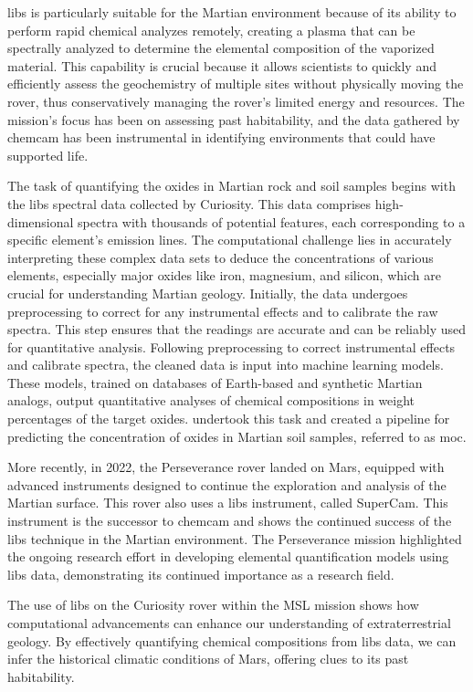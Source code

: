 \gls{libs} is particularly suitable for the Martian environment because of its ability to perform rapid chemical analyzes remotely, creating a plasma that can be spectrally analyzed to determine the elemental composition of the vaporized material. This capability is crucial because it allows scientists to quickly and efficiently assess the geochemistry of multiple sites without physically moving the rover, thus conservatively managing the rover's limited energy and resources. The mission's focus has been on assessing past habitability, and the data gathered by \gls{chemcam} has been instrumental in identifying environments that could have supported life\cite{chemcamNasaWebsite,curiosityNasaWebsite}.

The task of quantifying the oxides in Martian rock and soil samples begins with the \gls{libs} spectral data collected by Curiosity. This data comprises high-dimensional spectra with thousands of potential features, each corresponding to a specific element's emission lines. The computational challenge lies in accurately interpreting these complex data sets to deduce the concentrations of various elements, especially major oxides like iron, magnesium, and silicon, which are crucial for understanding Martian geology.
Initially, the data undergoes preprocessing to correct for any instrumental effects and to calibrate the raw spectra. This step ensures that the readings are accurate and can be reliably used for quantitative analysis. 
Following preprocessing to correct instrumental effects and calibrate spectra, the cleaned data is input into machine learning models. These models, trained on databases of Earth-based and synthetic Martian analogs, output quantitative analyses of chemical compositions in weight percentages of the target oxides\cite{wiensPreflightCalibrationInitial2013, cleggRecalibrationMarsScience2017}.
\citet{cleggRecalibrationMarsScience2017} undertook this task and created a pipeline for predicting the concentration of oxides in Martian soil samples, referred to as \gls{moc}.

More recently, in 2022, the Perseverance rover landed on Mars, equipped with advanced instruments designed to continue the exploration and analysis of the Martian surface. This rover also uses a \gls{libs} instrument, called SuperCam. This instrument is the successor to \gls{chemcam} and shows the continued success of the \gls{libs} technique in the Martian environment. The Perseverance mission highlighted the ongoing research effort in developing elemental quantification models using \gls{libs} data\cite{andersonPostlandingMajorElement2022}, demonstrating its continued importance as a research field.

The use of \gls{libs} on the Curiosity rover within the MSL mission shows how computational advancements can enhance our understanding of extraterrestrial geology. By effectively quantifying chemical compositions from \gls{libs} data, we can infer the historical climatic conditions of Mars, offering clues to its past habitability.
